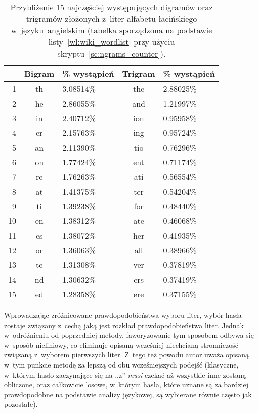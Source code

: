 \begin{myenumerate}
    \begin{table}[htb]
        \caption{Przybliżenie 15 najczęściej występujących digramów oraz
        trigramów złożonych z~liter alfabetu łacińskiego w~języku~angielskim
        (tabelka sporządzona na podstawie listy~\ref{wl:wiki_wordlist} przy
        użyciu skryptu~\ref{sc:ngrams_counter}).}
        \begin{tabular}{|r||c|l||c|l|}
            \hline
            & Bigram & \small \% wystąpień &
            Trigram & \small \% wystąpień \\
            \hline
            1  & th & 3.08514\% & the & 2.88025\% \\
            2  & he & 2.86055\% & and & 1.21997\% \\
            3  & in & 2.40712\% & ion & 0.95958\% \\
            4  & er & 2.15763\% & ing & 0.95724\% \\
            5  & an & 2.11390\% & tio & 0.76296\% \\
            6  & on & 1.77424\% & ent & 0.71174\% \\
            7  & re & 1.76263\% & ati & 0.56554\% \\
            8  & at & 1.41375\% & ter & 0.54204\% \\
            9  & ti & 1.39238\% & for & 0.48440\% \\
            10 & en & 1.38312\% & ate & 0.46068\% \\
            11 & es & 1.38072\% & her & 0.41935\% \\
            12 & or & 1.36063\% & all & 0.38966\% \\
            13 & te & 1.31308\% & ver & 0.37819\% \\
            14 & nd & 1.30632\% & ers & 0.37419\% \\
            15 & ed & 1.28358\% & ere & 0.37155\% \\
            \hline
        \end{tabular}
    \end{table}

    Wprowadzając zróżnicowane prawdopodobieństwa wyboru liter, wybór hasła
    zostaje związany z~cechą jaką jest rozkład prawdopodobieństwa liter. Jednak
    w~odróżnieniu od poprzedniej metody, faworyzowanie tym sposobem odbywa się
    w~sposób nieliniowy, co eliminuje opisaną wcześniej niechcianą stronniczość
    związaną z~wyborem pierwszych liter. Z~tego też powodu autor uważa opisaną
    w~tym punkcie metodę za lepszą od obu wcześniejszych podejść (klasyczne,
    w~którym hasło zaczynające się na ,,z'' \emph{musi} czekać aż wszystkie
    inne zostaną obliczone, oraz całkowicie losowe, w~którym hasła, które
    uznane są za bardziej prawdopodobne na podstawie analizy językowej, są
    wybierane równie często jak pozostałe).

\end{myenumerate}

